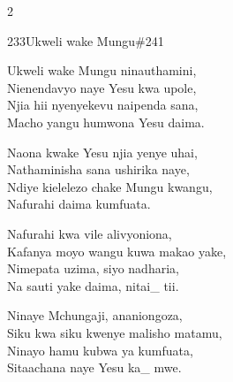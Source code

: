 \documentclass{article}
\begin{document}
\begin{multicols}{2}
\begin{hymn}{233}{Ukweli wake Mungu}{\#241}
\begin{stanza}
Ukweli wake Mungu ninauthamini,\\
Nienendavyo naye Yesu kwa upole,\\
Njia hii nyenyekevu naipenda sana,\\
Macho yangu humwona Yesu daima.
\end{stanza}
\begin{stanza}
Naona kwake Yesu njia yenye uhai,\\
Nathaminisha sana ushirika naye,\\
Ndiye kielelezo chake Mungu kwangu,\\
Nafurahi daima kumfuata.
\end{stanza}
\begin{stanza}
Nafurahi kwa vile alivyoniona,\\
Kafanya moyo wangu kuwa makao yake,\\
Nimepata uzima, siyo nadharia,\\
Na sauti yake daima, nitai\_ tii.
\end{stanza}
\begin{stanza}
Ninaye Mchungaji, ananiongoza,\\
Siku kwa siku kwenye malisho matamu,\\
Ninayo hamu kubwa ya kumfuata,\\
Sitaachana naye Yesu ka\_ mwe.
\end{stanza}
\end{hymn}


\end{multicols}
\end{document}
